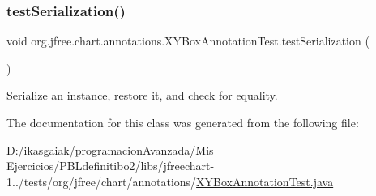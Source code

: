 \subsubsection{\texorpdfstring{test\+Serialization()}{testSerialization()}}
{\footnotesize\ttfamily void org.\+jfree.\+chart.\+annotations.\+X\+Y\+Box\+Annotation\+Test.\+test\+Serialization (\begin{DoxyParamCaption}{ }\end{DoxyParamCaption})}

Serialize an instance, restore it, and check for equality. 

The documentation for this class was generated from the following file\+:\begin{DoxyCompactItemize}
\item 
D\+:/ikasgaiak/programacion\+Avanzada/\+Mis Ejercicios/\+P\+B\+Ldefinitibo2/libs/jfreechart-\/1../tests/org/jfree/chart/annotations/\mbox{\hyperlink{_x_y_box_annotation_test_8java}{X\+Y\+Box\+Annotation\+Test.\+java}}\end{DoxyCompactItemize}
